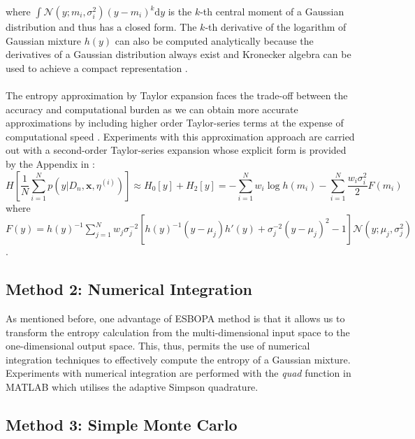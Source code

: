\documentclass[a4paper,11pt]{report}
\begin{document}
where $ \int  \mathcal{N}(y; m_i, \sigma_i^2) (y-m_i)^k \mathrm{d} y$ is the $k$-th central moment of a Gaussian distribution and thus has a closed form. The $k$-th derivative of the logarithm of Gaussian mixture $h(y)$ can also be computed analytically because the derivatives of a Gaussian distribution always exist and Kronecker algebra can be used to achieve a compact representation \cite{huber2008entropy}. 
\\\\ \noindent
The entropy approximation by Taylor expansion faces the trade-off between the accuracy and computational burden as we can obtain more accurate approximations by including higher order Taylor-series terms at the expense of computational speed \cite{huber2008entropy}. Experiments with this approximation approach are carried out with a second-order Taylor-series expansion whose explicit form is provided by the Appendix in \cite{huber2008entropy}:
	\begin{equation}
	H \left[ \frac{1}{N}  \sum_{i=1}^{N} p(y \vert D_n,\mathbf{x},\eta^{(i)}) \right] \approx H_0[y] + H_2[y] 
	 =  - \sum_{i=1} ^N w_i \log h( m_i ) -  \sum_{i=1} ^N \frac{w_i \sigma_i^2}{2} F(m_i)
	\end{equation}
where $ F(y) = h(y)^{-1}\sum_{j=1}^N w_j \sigma_{j}^{-2} \left[ h(y)^{-1} (y - \mu_j) h' (y) + \sigma_j^{-2} (y- \mu_j)^2 -1 \right] \mathcal{N} (y; \mu_j,  \sigma_j^{2}) $.


\subsection{Method 2: Numerical Integration}

As mentioned before, one advantage of ESBOPA method is that it allows us to transform the entropy calculation from the multi-dimensional input space to the one-dimensional output space. This, thus, permits the use of numerical integration techniques to effectively compute the entropy of a Gaussian mixture.  %
Experiments with numerical integration are performed with the \textit{quad} function in MATLAB which utilises the adaptive Simpson quadrature. 

\subsection{Method 3: Simple Monte Carlo }
\end{document}
